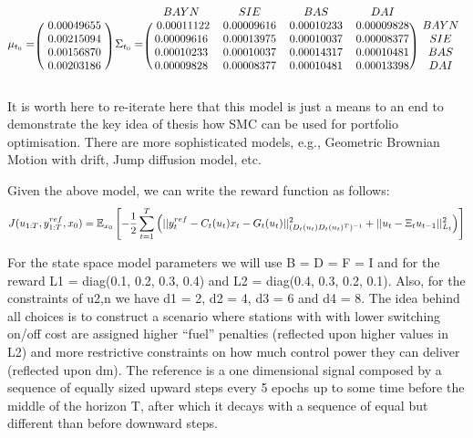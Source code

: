 \begin{equation}
\mu_{t_0} =
\begin{blockarray}{c}
\\
\begin{block}{(c)}
~ 0.00049655 ~ \\
0.00215094 \\
0.00156870 \\
0.00203186 \\
\end{block}
\end{blockarray}
~\Sigma_{t_0} =
\begin{blockarray}{ccccc}
  BAYN & SIE & BAS & DAI & \\
\begin{block}{(cccc)c}
 ~ 0.00011122 & 0.00009616 & 0.00010233 & 0.00009828 ~ & BAYN \\
0.00009616 & 0.00013975 & 0.00010037 & 0.00008377 ~ & SIE \\
0.00010233 & 0.00010037 & 0.00014317 & 0.00010481 & BAS \\
0.00009828 & 0.00008377 & 0.00010481 & 0.00013398 & DAI \\
\end{block}
\end{blockarray}
\end{equation}
 
It is worth here to re-iterate here that this model is just a means to an end to demonstrate the key idea of thesis how SMC can be used for portfolio optimisation. There are more sophisticated models, e.g., Geometric Brownian Motion with drift, Jump diffusion model, etc.
 
Given the above model, we can write the reward function as follows:
\begin{equation}
  J(u_{1:T},y^{ref}_{1:T}, x_0) = \operatorname{\mathbb{E}}_{x_0}\left[ -\dfrac{1}{2}\displaystyle\sum^T_{t=1}\left(\vert\vert y^{ref}_t - C_t(u_t)x_t - G_t(u_t) \vert\vert^2_{(D_t(u_t)D_t(u_t)^T)^{-1}}  + \vert\vert u_t - \Xi_t u_{t-1} \vert\vert^2_{L_t}\right) \right]
\end{equation}
 
For the state space model parameters we will use B = D = F = I and for the reward L1 = diag(0.1, 0.2, 0.3, 0.4) and L2 = diag(0.4, 0.3, 0.2, 0.1). Also, for the constraints of u2,n we have d1 = 2, d2 = 4, d3 = 6 and d4 = 8. The idea behind all choices is to construct a scenario where stations with with lower switching on/off cost are assigned higher “fuel” penalties (reflected upon higher values in L2) and more restrictive constraints on how much control power they can deliver (reflected upon dm). The reference is a one dimensional signal composed by a sequence of equally sized upward steps every 5 epochs up to some time before the middle of the horizon T, after which it decays with a sequence of equal but different than before downward steps.
 
